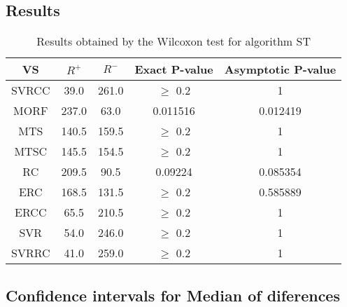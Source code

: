 \documentclass[a4paper,10pt]{article}
\begin{document}
\subsection{Results}

\begin{table}[!htp]
\centering\small
\begin{tabular}{
|c|c|c|c|c|}
\hline
 VS & $R^{+}$ & $R^{-}$ & Exact P-value & Asymptotic P-value \\ \hline 
SVRCC & 39.0 & 261.0 & $\geq$ 0.2 & 1\\ \hline 
MORF & 237.0 & 63.0 & 0.011516 & 0.012419\\ \hline 
MTS & 140.5 & 159.5 & $\geq$ 0.2 & 1\\ \hline 
MTSC & 145.5 & 154.5 & $\geq$ 0.2 & 1\\ \hline 
RC & 209.5 & 90.5 & 0.09224 & 0.085354\\ \hline 
ERC & 168.5 & 131.5 & $\geq$ 0.2 & 0.585889\\ \hline 
ERCC & 65.5 & 210.5 & $\geq$ 0.2 & 1\\ \hline 
SVR & 54.0 & 246.0 & $\geq$ 0.2 & 1\\ \hline 
SVRRC & 41.0 & 259.0 & $\geq$ 0.2 & 1\\ \hline 

\end{tabular}
\caption{Results obtained by the Wilcoxon test for algorithm ST}
\end{table}

\subsection{Confidence intervals for Median of diferences}
\end{document}
